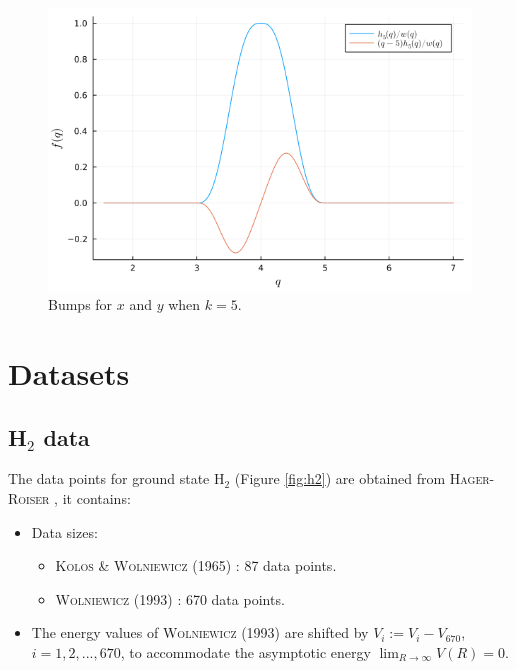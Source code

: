 \documentclass[12pt]{article}
\begin{document}
\begin{figure}[H]
    \centering
    \includegraphics[scale=0.7]{img/BUMP/BUMP_k=5.png}
    \caption{Bumps for $x$ and $y$ when $k=5$.}
    \label{fig:linear_BUMP_k=5}
\end{figure}

\section{Datasets}
\subsection{H$_2$ data}
The data points for ground state H$_2$ (Figure \ref{fig:h2}) are obtained from \textsc{Hager-Roiser} \cite{ulrik}, it contains:
\begin{itemize}
    \item Data sizes:
    \begin{itemize}
        \item \textsc{Kolos \& Wolniewicz} (1965) \cite{idx166}: 87 data points.
        \item \textsc{Wolniewicz} (1993) \cite{idx167}: 670 data points.
    \end{itemize}
    \item The energy values of \textsc{Wolniewicz} (1993) are shifted by $V_i := V_i-V_{670}$, $i=1,2,...,670$, to accommodate the asymptotic energy $\lim_{R \to \infty} V(R) = 0$.
\end{itemize}
\end{document}
